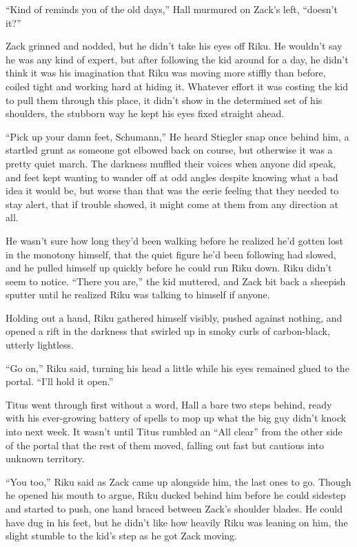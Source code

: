 ``Kind of reminds you of the old days,'' Hall murmured on Zack's left, ``doesn't it?''

Zack grinned and nodded, but he didn't take his eyes off Riku. He wouldn't say he was any kind of expert, but after following the kid around for a day, he didn't think it was his imagination that Riku was moving more stiffly than before, coiled tight and working hard at hiding it. Whatever effort it was costing the kid to pull them through this place, it didn't show in the determined set of his shoulders, the stubborn way he kept his eyes fixed straight ahead.

``Pick up your damn feet, Schumann,'' He heard Stiegler snap once behind him, a startled grunt as someone got elbowed back on course, but otherwise it was a pretty quiet march. The darkness muffled their voices when anyone did speak, and feet kept wanting to wander off at odd angles despite knowing what a bad idea it would be, but worse than that was the eerie feeling that they needed to stay alert, that if trouble showed, it might come at them from any direction at all.

He wasn't sure how long they'd been walking before he realized he'd gotten lost in the monotony himself, that the quiet figure he'd been following had slowed, and he pulled himself up quickly before he could run Riku down. Riku didn't seem to notice. ``There you are,'' the kid muttered, and Zack bit back a sheepish sputter until he realized Riku was talking to himself if anyone.

Holding out a hand, Riku gathered himself visibly, pushed against nothing, and opened a rift in the darkness that swirled up in smoky curls of carbon-black, utterly lightless.

``Go on,'' Riku said, turning his head a little while his eyes remained glued to the portal. ``I'll hold it open.''

Titus went through first without a word, Hall a bare two steps behind, ready with his ever-growing battery of spells to mop up what the big guy didn't knock into next week. It wasn't until Titus rumbled an ``All clear'' from the other side of the portal that the rest of them moved, falling out fast but cautious into unknown territory.

``You too,'' Riku said as Zack came up alongside him, the last ones to go. Though he opened his mouth to argue, Riku ducked behind him before he could sidestep and started to push, one hand braced between Zack's shoulder blades. He could have dug in his feet, but he didn't like how heavily Riku was leaning on him, the slight stumble to the kid's step as he got Zack moving.


